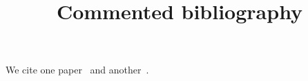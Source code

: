 \documentclass[aps,pra,reprint]{revtex4-2}
\begin{document}
\title{Commented bibliography}
\maketitle
We cite one paper~\cite{alpha} and another~\cite{beta}.


%
%
\end{document}
